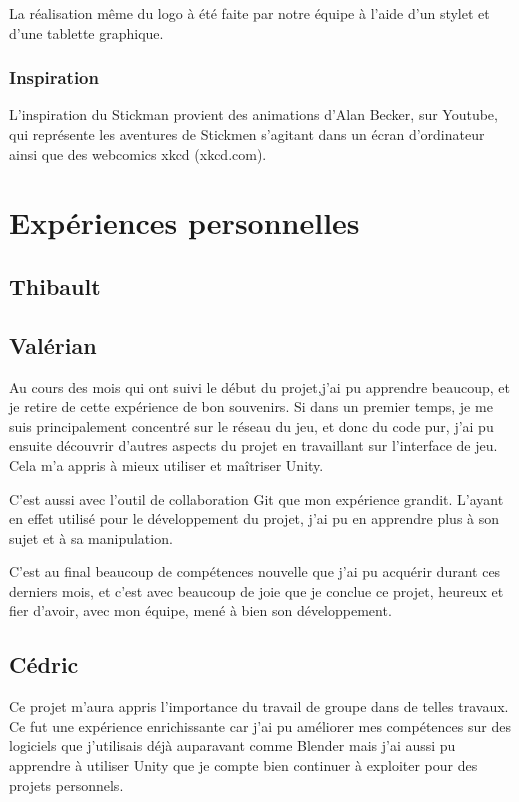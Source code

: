 \documentclass[12pt]{report}
\begin{document}
La réalisation même du logo à été faite par notre équipe à l’aide d’un stylet et
d’une tablette graphique.

\subsection{Inspiration}

L’inspiration du Stickman provient des animations d’Alan Becker, sur Youtube,
qui représente les aventures de Stickmen s’agitant dans un écran d’ordinateur
ainsi que des webcomics xkcd (xkcd.com). 

\chapter{Expériences personnelles}

\section{Thibault}

\section{Valérian}

Au cours des mois qui ont suivi le début du projet,j’ai pu apprendre beaucoup,
et je retire de cette expérience de bon souvenirs. Si dans un premier temps, je
me suis principalement concentré sur le réseau du jeu, et donc du code pur, j’ai
pu ensuite découvrir d’autres aspects du projet en travaillant sur l’interface
de jeu. Cela m’a appris à mieux utiliser et maîtriser Unity. 

C’est aussi avec l’outil de collaboration Git que mon expérience grandit.
L’ayant en effet utilisé pour le développement du projet, j’ai pu en apprendre
plus à son sujet et à sa manipulation. 

C’est au final beaucoup de compétences nouvelle que j’ai pu acquérir durant ces
derniers mois, et c’est avec beaucoup de joie que je conclue ce projet, heureux
et fier d’avoir, avec mon équipe, mené à bien son développement.

\section{Cédric}

Ce projet m’aura appris l’importance du travail de groupe dans de telles
travaux. Ce fut une expérience enrichissante car j’ai pu améliorer mes
compétences sur des logiciels que j’utilisais déjà auparavant comme Blender mais
j’ai aussi pu apprendre à utiliser Unity que je compte bien continuer à
exploiter pour des projets personnels. 
\end{document}
